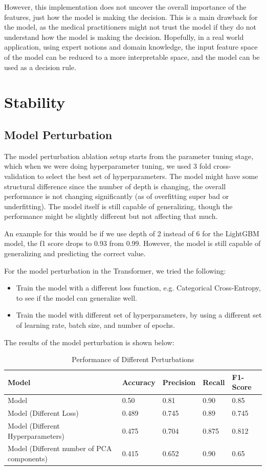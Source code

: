 \documentclass[10pt,letterpaper]{article}
\begin{document}
However, this implementation does not uncover the overall importance of the features, just how the model is making the decision.
This is a main drawback for the model, as the medical practitioners might not trust the model if they do not understand how the model is making the decision.
Hopefully, in a real world application, using expert notions and domain knowledge, the input feature space of the model can 
be reduced to a more interpretable space, and the model can be used as a decision rule.

\section{Stability}
\subsection{Model Perturbation}
The model perturbation ablation setup starts from the parameter tuning stage, which when we were doing hyperparameter tuning, we used 3 fold cross-validation to select the best set of hyperparameters. The model might have some structural difference since the number of depth is changing, the overall performance is not changing significantly (as of overfitting super bad or underfitting). The model itself is still capable of generalizing, though the performance might be slightly different but not affecting that much.

An example for this would be if we use depth of 2 instead of 6 for the LightGBM model, the f1 score drops to 0.93 from 0.99. However, the model is still capable of generalizing and predicting the correct value.

For the model perturbation in the Transformer, we tried the following:
\begin{itemize}
    \item Train the model with a different loss function, e.g. Categorical Cross-Entropy, to see if the model can generalize well.
    \item Train the model with different set of hyperparameters, by using a different set of learning rate, batch size, and number of epochs.
\end{itemize}

The results of the model perturbation is shown below:

\begin{table}[H]
\centering
\footnotesize
\begin{tabular}{lllll}
\toprule
\textbf{Model} & \textbf{Accuracy} & \textbf{Precision} & \textbf{Recall} &  \textbf{F1-Score}\\
\midrule
Model & 0.50 & 0.81  & 0.90 & 0.85  \\
Model (Different Loss) & 0.489 & 0.745  & 0.89 & 0.745  \\
Model (Different Hyperparameters) & 0.475 & 0.704  & 0.875 & 0.812  \\
Model (Different number of PCA components) & 0.415 & 0.652 & 0.90 & 0.65  \\
\bottomrule
\end{tabular}
\caption{Performance of Different Perturbations}%
\end{table}
\end{document}
